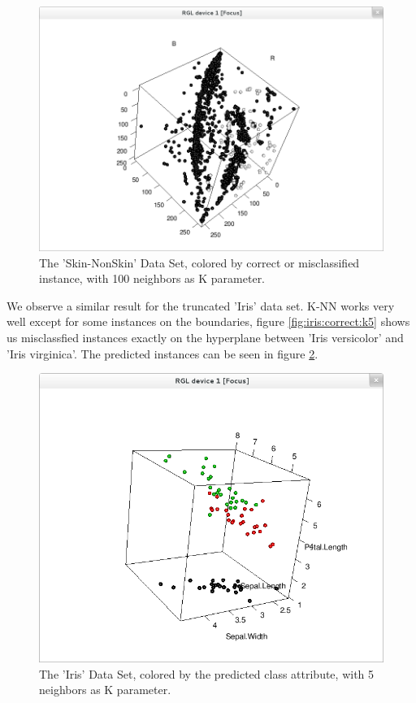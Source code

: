 \documentclass[paper=a4, fontsize=11pt]{scrartcl} %
\numberwithin{equation}{section} %
\numberwithin{figure}{section} %
\numberwithin{table}{section} %
\begin{document}
\begin{figure}[\textwidth]
    \begin{center}
\includegraphics[width=\textwidth]{Skin_correct_k100}
    \end{center}
\caption['Skin-NonSkin' correctness with k=100]{The 'Skin-NonSkin' Data Set, colored by correct or misclassified instance, with 100 neighbors as K parameter.}
\label{fig:skin:correct:k100}
\end{figure}

We observe a similar result for the truncated 'Iris' data set. K-NN works very well except for some instances on the boundaries, figure \ref{fig:iris:correct:k5} shows us misclassfied instances exactly on the hyperplane between 'Iris versicolor' and 'Iris virginica'. The predicted instances can be seen in figure \ref{fig:iris:predicted:k5}.
\begin{figure}[\textwidth]
    \begin{center}
\includegraphics[width=\textwidth]{Iris_predicted_k5}
    \end{center}
\caption['Iris' prediction with k=5]{The 'Iris' Data Set, colored by the predicted class attribute, with 5 neighbors as K parameter.}
\label{fig:iris:predicted:k5}
\end{figure}
\end{document}
